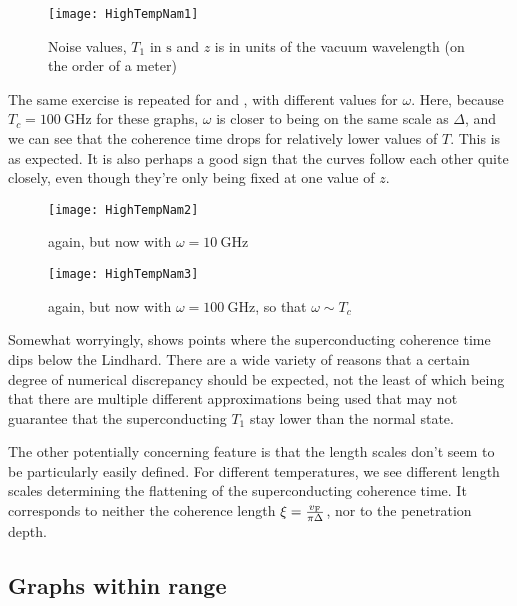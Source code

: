 \documentclass[../main.tex]{subfiles}
\begin{document}
	\begin{figure}[htp]
		\centering
		\texttt{[image: HighTempNam1]}
		\caption{Noise values, $T_1$ in $\si{\second}$ and $z$ is in units of the vacuum wavelength (on the order of a meter)} \label{fig:htn:1}
	\end{figure}

	The same exercise is repeated for  and , with different values for $\omega$.
	Here, because $T_c=\SI{100}{\giga\Hz}$ for these graphs, $\omega$ is closer to being on the same scale as $\Delta$, and we can see that the coherence time drops for relatively lower values of $T$.
	This is as expected.
	It is also perhaps a good sign that the curves follow each other quite closely, even though they're only being fixed at one value of $z$.

	\begin{figure}[htp]
		\centering
		\texttt{[image: HighTempNam2]}
		\caption{ again, but now with $\omega = \SI{10}{\giga\Hz}$} \label{fig:htn:2}
	\end{figure}
	\begin{figure}[htp]
		\centering
		\texttt{[image: HighTempNam3]}
		\caption{ again, but now with $\omega = \SI{100}{\giga\Hz}$, so that $\omega \sim T_c$} \label{fig:htn:3}
	\end{figure}

	Somewhat worryingly,  shows points where the superconducting coherence time dips below the Lindhard.
	There are a wide variety of reasons that a certain degree of numerical discrepancy should be expected, not the least of which being that there are multiple different approximations being used that may not guarantee that the superconducting $T_1$ stay lower than the normal state.

	The other potentially concerning feature is that the length scales don't seem to be particularly easily defined.
	For different temperatures, we see different length scales determining the flattening of the superconducting coherence time.
	It corresponds to neither the coherence length $\xi = \frac{v_{\mathrm{F}}}{\pi \Delta}$, nor to the penetration depth.

	\subsection{Graphs within range} \label{subsec:htn:smallergraphs}
\end{document}
